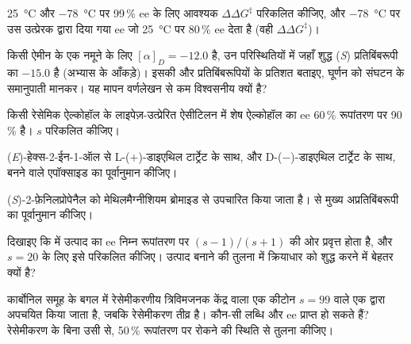 \begin{exercise}[$\star\star$]\label{exo:b3:asymmetric-synthesis:5}
\qty{25}{\celsius} और \qty{-78}{\celsius} पर 99\,\% ee के लिए आवश्यक $\Delta\Delta G^\ddagger$ परिकलित कीजिए, और \qty{-78}{\celsius} पर
उस उत्प्रेरक द्वारा दिया गया ee जो \qty{25}{\celsius} पर 80\,\% ee देता है (वही $\Delta\Delta G^\ddagger$)।
\end{exercise}

\begin{exercise}[$\star\star$]\label{exo:b3:asymmetric-synthesis:6}
किसी ऐमीन के एक नमूने के लिए $[\alpha]_D = -12.0$ है, उन परिस्थितियों में जहाँ शुद्ध (\textit{S})
प्रतिबिंबरूपी का $-15.0$ है (अभ्यास के आँकड़े)। इसकी  और
प्रतिबिंबरूपियों के प्रतिशत बताइए, घूर्णन को संघटन के समानुपाती मानकर।
यह मापन वर्णलेखन से कम विश्वसनीय क्यों है?
\end{exercise}

\begin{exercise}[$\star\star$]\label{exo:b3:asymmetric-synthesis:7}
किसी रेसेमिक ऐल्कोहॉल के लाइपेज़-उत्प्रेरित ऐसीटिलन में शेष ऐल्कोहॉल
का ee 60\,\% रूपांतरण पर 90\,\% है। $s$ परिकलित कीजिए।
\end{exercise}

\begin{exercise}[$\star\star$]\label{exo:b3:asymmetric-synthesis:8}
(\textit{E})-हेक्स-2-ईन-1-ऑल से L-($+$)-डाइएथिल टार्ट्रेट के साथ, और
D-($-$)-डाइएथिल टार्ट्रेट के साथ, बनने वाले एपॉक्साइड का पूर्वानुमान कीजिए।
\end{exercise}

\begin{exercise}[$\star\star$]\label{exo:b3:asymmetric-synthesis:9}
(\textit{S})-2-फ़ेनिलप्रोपेनैल को मेथिलमैग्नीशियम ब्रोमाइड से उपचारित किया जाता है।  से मुख्य अप्रतिबिंबरूपी का पूर्वानुमान कीजिए।
\end{exercise}

\begin{exercise}[$\star\star\star$]\label{exo:b3:asymmetric-synthesis:10}
दिखाइए कि  में उत्पाद का ee निम्न रूपांतरण पर $(s - 1)/(s + 1)$ की ओर
प्रवृत्त होता है, और $s = 20$ के लिए इसे परिकलित कीजिए।  उत्पाद बनाने की तुलना में
क्रियाधार को शुद्ध करने में बेहतर क्यों है?
\end{exercise}

\begin{exercise}[$\star\star\star$]\label{exo:b3:asymmetric-synthesis:11}
कार्बोनिल समूह के बगल में रेसेमीकरणीय त्रिविमजनक केंद्र वाला एक कीटोन
$s = 99$ वाले एक  द्वारा अपचयित किया जाता है, जबकि रेसेमीकरण तीव्र है। कौन-सी लब्धि और ee
प्राप्त हो सकते हैं? रेसेमीकरण के बिना उसी  से, 50\,\%
रूपांतरण पर रोकने की स्थिति से तुलना कीजिए।
\end{exercise}

